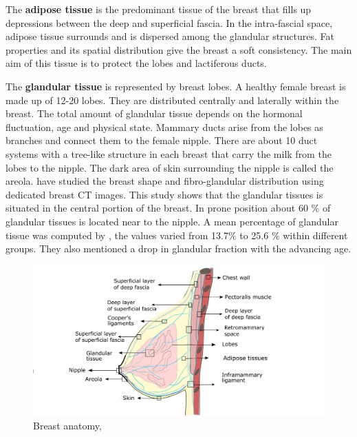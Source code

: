 The \textbf{ adipose tissue} is the predominant tissue of the breast that fills up depressions between the deep and superficial fascia. In the intra-fascial space, adipose tissue surrounds and is dispersed among the glandular structures. Fat properties and its spatial distribution give the breast a soft consistency. The main aim of this tissue is to protect the lobes and lactiferous ducts.

The \textbf{ glandular tissue} is represented by breast lobes. A healthy female breast is made up of 12-20 lobes. They are distributed centrally and laterally within the breast. The total amount of glandular tissue depends on the hormonal fluctuation, age and physical state.  Mammary ducts arise from the lobes as branches and connect them to the female nipple. There are about 10 duct systems with a tree-like structure in each breast that carry the milk from the lobes to the nipple. The dark area of skin surrounding the nipple is called the areola. \cite{huang2011characterization} have studied the breast shape and fibro-glandular distribution using dedicated breast CT images. This study shows that the glandular tissues is situated in the central portion of the breast. In prone position about 60 $\%$ of glandular tissues is located near to the nipple. A mean percentage of glandular tissue was computed by \cite{yaffe2009myth}, the values varied from 13.7$\%$ to 25.6 $\%$ within different groups. They also mentioned a drop in glandular fraction with the advancing age. 


\begin{center}
\begin{figure}[h]
\includegraphics[width=\textwidth,keepaspectratio]{figures/anatomieSeinEuBlack2.png} 
\caption{Breast anatomy, \citep{clemente2011anatomy}}
\label{fig:breastanatomy}
\end{figure}
\end{center}

